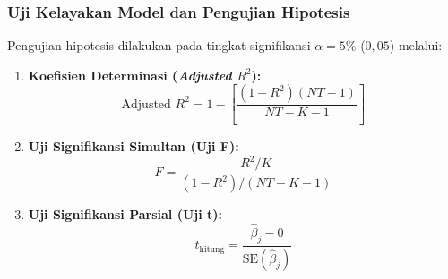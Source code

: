 \documentclass[12pt,a4paper]{article}
\numberwithin{equation}{section}
\begin{document}
\subsubsection{Uji Kelayakan Model dan Pengujian Hipotesis}
\noindent
Pengujian hipotesis dilakukan pada tingkat signifikansi $\alpha = 5\%$ ($0{,}05$) melalui:
\begin{enumerate}
  \item \textbf{Koefisien Determinasi (\emph{Adjusted} $R^2$):}
    \begin{equation}
      \text{Adjusted } R^2 = 1 - \left[ \frac{(1 - R^2)(NT - 1)}{NT - K - 1} \right]
    \end{equation}
  \item \textbf{Uji Signifikansi Simultan (Uji F):}
    \begin{equation}
      F = \frac{R^2 / K}{(1 - R^2) / (NT - K - 1)}
    \end{equation}
  \item \textbf{Uji Signifikansi Parsial (Uji t):}
    \begin{equation}
      t_{\text{hitung}} = \frac{\hat{\beta}_j - 0}{\text{SE}(\hat{\beta}_j)}
    \end{equation}
\end{enumerate}
\end{document}
